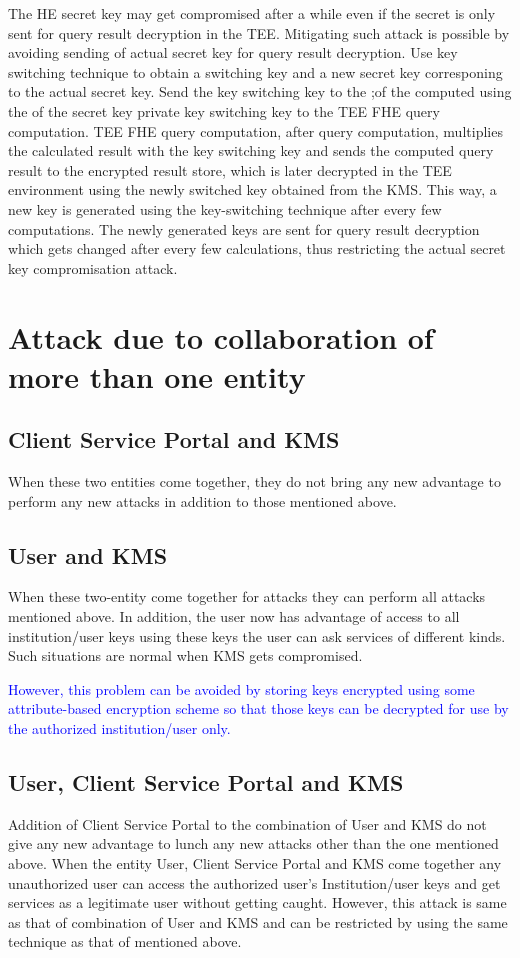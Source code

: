 The HE secret key may get compromised after a while even if the secret is only sent for query result decryption in the TEE. Mitigating such attack is possible by avoiding sending of actual secret key for query result decryption. Use key switching technique to obtain a switching key and a new secret key corresponing to the actual secret key. Send the key switching key to the ;of the computed using the of the secret key private key switching key to the TEE FHE query computation. TEE FHE query computation, after query computation, multiplies the calculated result with the key switching key and sends the computed query result to the encrypted result store, which is later decrypted in the TEE environment using the newly switched key obtained from the KMS. This way, a new key is generated using the key-switching technique after every few computations. The newly generated keys are sent for query result decryption which gets changed after every few calculations, thus restricting the actual secret key compromisation attack.

\section{Attack due to collaboration of more than one entity}
\subsection{Client Service Portal and KMS} When these two entities come together, they do not bring any new advantage to perform any new attacks in addition to those mentioned above.

\subsection{User and KMS} When these two-entity come together for attacks they can perform all attacks mentioned above. In addition, the user now has advantage of access to all institution/user keys using these keys the user can ask services of different kinds. Such situations are normal when KMS gets compromised.

\textcolor{blue} {However, this problem can be avoided by storing keys encrypted using some attribute-based encryption scheme so that those keys can be decrypted for use by the authorized institution/user only.}

\subsection{User, Client Service Portal and KMS} Addition of Client Service Portal to the combination of User and KMS do not give any new advantage to lunch any new attacks other than the one mentioned above. When the entity User, Client Service Portal and KMS come together any unauthorized user can access the authorized user’s Institution/user keys and get services as a legitimate user without getting caught. However, this attack is same as that of combination of User and KMS and can be restricted by using the same technique as that of mentioned above.

